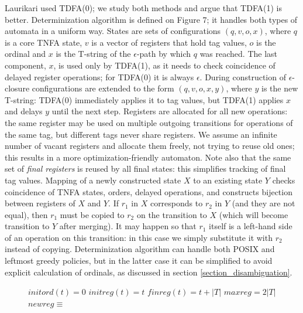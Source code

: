 \documentclass{article}
\newcommand{\Xeq}{\!=\!}
\newcommand{\XN}{\mathcal{N}}
\theoremstyle{definition}
\begin{document}
\begin{multicols}{2}
Laurikari used TDFA(0); we study both methods and argue that TDFA(1) is better.
Determinization algorithm is defined on Figure 7;
it handles both types of automata in a uniform way.
States are sets of configurations $(q, v, o, x)$,
where $q$ is a core TNFA state, $v$ is a vector of registers that hold tag values, $o$ is the ordinal
and $x$ is the T-string of the $\epsilon$-path by which $q$ was reached.
The last component, $x$, is used only by TDFA(1), as it needs to check coincidence of delayed register operations;
for TDFA(0) it is always $\epsilon$.
During construction of $\epsilon$-closure configurations are extended to the form $(q, v, o, x, y)$,
where $y$ is the new T-string: TDFA(0) immediately applies it to tag values,
but TDFA(1) applies $x$ and delays $y$ until the next step.
Registers are allocated for all new operations:
the same register may be used on multiple outgoing transitions for operations of the same tag,
but different tags never share registers.
We assume an infinite number of vacant registers and allocate them freely, not trying to reuse old ones;
this results in a more optimization-friendly automaton.
Note also that the same set of \emph{final registers} is reused by all final states:
this simplifies tracking of final tag values.
Mapping of a newly constructed state $X$ to an existing state $Y$ checks coincidence of TNFA states, orders, delayed operations,
and constructs bijection between registers of $X$ and $Y$.
If $r_1$ in $X$ corresponds to $r_2$ in $Y$ (and they are not equal), then $r_1$ must be copied to $r_2$ on the transition to $X$
(which will become transition to $Y$ after merging).
It may happen so that $r_1$ itself is a left-hand side of an operation on this transition:
in this case we simply substitute it with $r_2$ instead of copying.
Determinization algorithm can handle both POSIX and leftmost greedy policies,
but in the latter case it can be simplified to avoid explicit calculation of ordinals, as discussed in section \ref{section_disambiguation}.

\begin{figure}
\begin{algorithm}[H] \DontPrintSemicolon {}   
\begin{multicols}{2}

    \Fn {$\underline{determinization(\XN \Xeq (\Sigma, T, Q, F, q_0, T, \Delta), \ell)} \smallskip$} {

        \Let $initord(t) \Xeq 0$ \;
        \Let $initreg(t) \Xeq t$ \;
        \Let $finreg(t) \Xeq t + |T|$ \;
        \Let $maxreg \Xeq 2|T|$ \;
        \Let $newreg \equiv $ \Und \;

}
\end{multicols}
\end{algorithm}
\end{figure}
\end{multicols}
\end{document}
